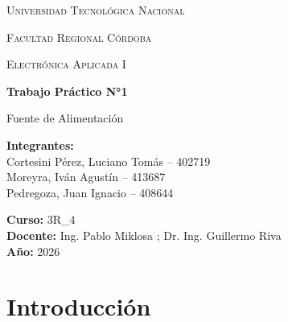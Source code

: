 \documentclass[12pt,a4paper]{article}
\begin{document}
\begin{titlepage}
    \centering

    {\scshape\LARGE Universidad Tecnológica Nacional \par}
    \vspace{0.3cm}
    {\scshape\Large Facultad Regional Córdoba \par}
    \vspace{1.5cm}

    {\scshape\Large Electrónica Aplicada I \par}
    \vspace{2cm}

    {\Huge\bfseries Trabajo Práctico N°1 \par}
    \vspace{0.5cm}
    {\LARGE Fuente de Alimentación \par}

    \vspace{2cm}

    \begin{flushleft}
    \textbf{Integrantes:} \\
    Cortesini Pérez, Luciano Tomás -- 402719 \\
    Moreyra, Iván Agustín -- 413687 \\
    Pedregoza, Juan Ignacio  -- 408644 \\

    \vspace{0.5cm}

    \textbf{Curso:} 3R\_4 \\
    \textbf{Docente:} Ing. Pablo Miklosa ; Dr. Ing. Guillermo Riva  \\
    \textbf{Año:} 2026 \\
    \end{flushleft}

    \vfill

\end{titlepage}
\thispagestyle{empty}

\vspace{1cm}

\tableofcontents
\newpage

\section{Introducción}
\end{document}
